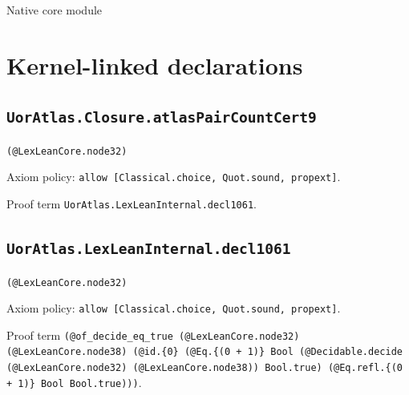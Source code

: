 \documentclass[11pt]{article}
\begin{document}
\begin{center}{\LARGE Native core module}\end{center}
\section*{Kernel-linked declarations}
\subsection*{\texttt{UorAtlas.Closure.atlasPairCountCert9}}
\noindent\texttt{(@LexLeanCore.node32)}\par
\noindent Axiom policy: \texttt{allow [Classical.choice, Quot.sound, propext]}.\par
\noindent Proof term \texttt{UorAtlas.LexLeanInternal.decl1061}.\par
\subsection*{\texttt{UorAtlas.LexLeanInternal.decl1061}}
\noindent\texttt{(@LexLeanCore.node32)}\par
\noindent Axiom policy: \texttt{allow [Classical.choice, Quot.sound, propext]}.\par
\noindent Proof term \texttt{(@of\_decide\_eq\_true (@LexLeanCore.node32) (@LexLeanCore.node38) (@id.\{0\} (@Eq.\{(0 + 1)\} Bool (@Decidable.decide (@LexLeanCore.node32) (@LexLeanCore.node38)) Bool.true) (@Eq.refl.\{(0 + 1)\} Bool Bool.true)))}.\par
\end{document}
